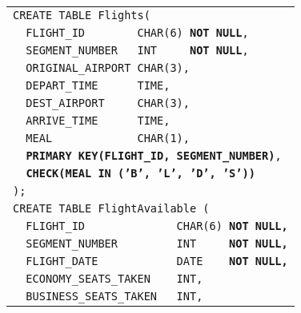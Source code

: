 \documentclass[12pt]{article}
\begin{document}
\begin{enumerate}
              \newpage

              \begin{figure}[hp]
                \centering
                \normalsize
                \begin{tabular}{l}
                  \texttt{CREATE TABLE Flights(}                                        \\
                  \texttt{~~FLIGHT\_ID~~~~~~~~CHAR(6)~\textbf{NOT NULL},}               \\
                  \texttt{~~SEGMENT\_NUMBER~~~INT~~~~~\textbf{NOT~NULL},}               \\
                  \texttt{~~ORIGINAL\_AIRPORT~CHAR(3),}                                 \\
                  \texttt{~~DEPART\_TIME~~~~~~TIME,}                                    \\
                  \texttt{~~DEST\_AIRPORT~~~~~CHAR(3),}                                 \\
                  \texttt{~~ARRIVE\_TIME~~~~~~TIME,}                                    \\
                  \texttt{~~MEAL  ~~~~~~~~~~~~CHAR(1),}                                 \\
                  \texttt{~~\textbf{PRIMARY KEY(FLIGHT\_ID, SEGMENT\_NUMBER)},}         \\
                  \texttt{~~\textbf{CHECK(MEAL IN ('B', 'L', 'D', 'S'))}}               \\
                  \texttt{);} \vspace{2mm}                                              \\                                                                    
                  \texttt{CREATE TABLE FlightAvailable (}                               \\
                  \texttt{~~FLIGHT\_ID~~~~~~~~~~~~~~CHAR(6) \textbf{NOT NULL,}}         \\
                  \texttt{~~SEGMENT\_NUMBER~~~~~~~~~INT~~~~~\textbf{NOT NULL,}}         \\
                  \texttt{~~FLIGHT\_DATE~~~~~~~~~~~~DATE~~~~\textbf{NOT NULL,}}         \\
                  \texttt{~~ECONOMY\_SEATS\_TAKEN~~~~INT,}                              \\
                  \texttt{~~BUSINESS\_SEATS\_TAKEN~~~INT,}                              \\

\end{tabular}
\end{figure}
\end{enumerate}
\end{document}

